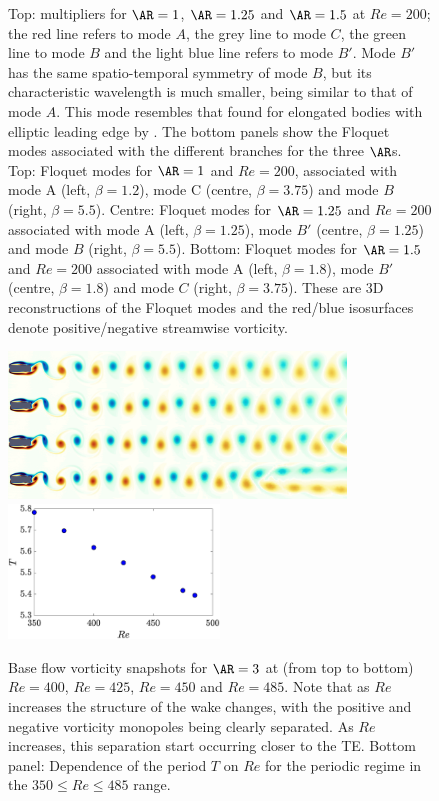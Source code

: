 \documentclass{jfm}
\begin{document}
\begin{figure}
  \caption{Top: multipliers for $\AR=1$, $\AR=1.25$ and $\AR=1.5$ at $Re=200$; the red line refers to mode $A$, the grey line to mode $C$, the green line to mode $B$ and the light blue line refers to mode $B'$. Mode $B'$ has the same spatio-temporal symmetry of mode $B$, but its characteristic wavelength is much smaller, being similar to that of mode $A$. This mode resembles that found for elongated bodies with elliptic leading edge by \cite{ryan-etal-2005}. The bottom panels show the Floquet modes associated with the different branches for the three $\AR$s. Top: Floquet modes for $\AR=1$ and $Re=200$, associated with mode A (left, $\beta=1.2$), mode C (centre, $\beta=3.75$) and mode $B$ (right, $\beta=5.5$). Centre: Floquet modes for $\AR=1.25$ and $Re=200$ associated with mode A (left, $\beta=1.25$), mode $B'$ (centre, $\beta = 1.25$) and mode $B$ (right, $\beta=5.5$). Bottom: Floquet modes for $\AR=1.5$ and $Re=200$ associated with mode A (left, $\beta=1.8$), mode $B'$ (centre, $\beta=1.8$) and mode $C$ (right, $\beta=3.75$). These are 3D reconstructions of the Floquet modes and the red/blue isosurfaces denote positive/negative streamwise vorticity.}
  \label{fig:xx}
\end{figure}


\begin{figure}
  \centering
  \includegraphics[width=0.8\textwidth]{./fig/AR3/BF_vort_Re400_475.png}
  \includegraphics[width=0.5\textwidth]{./fig/AR3/T_Re.eps}
  \caption{Base flow vorticity snapshots for $\AR=3$ at (from top to bottom) $Re=400$, $Re=425$, $Re=450$ and $Re=485$. Note that as $Re$ increases the structure of the wake changes, with the positive and negative vorticity monopoles being clearly separated. As $Re$ increases, this separation start occurring closer to the TE. Bottom panel: Dependence of the period $T$ on $Re$ for the periodic regime in the $350 \le Re \le 485$ range.}
  \label{fig:BF_AR3}
\end{figure}
\end{document}
